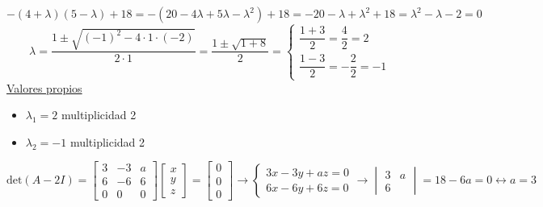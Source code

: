 \begin{enumerate}[label=\color{red}\textbf{\arabic*)}]
    $-(4+\lambda)(5-\lambda)+18=-(20-4\lambda+5\lambda -\lambda^2)+18=-20-\lambda+\lambda^2+18=\lambda^2-\lambda-2=0$ \[
    \lambda=\dfrac{1\pm\sqrt{(-1)^2-4\cdot 1\cdot (-2)} }{2\cdot 1}=\dfrac{1\pm\sqrt{1+8} }{2}=\begin{cases}
        \dfrac{1+3}{2}=\dfrac{4}{2}=2\\
        \dfrac{1-3}{2}=-\dfrac{2}{2}=-1
    \end{cases} 
    \] 
    \underline{Valores propios}
\begin{itemize}[label=\textbullet]
    \item $\lambda_1=2$ multiplicidad 2
    \item $\lambda_2=-1$ multiplicidad 2
\end{itemize}
$\mathrm{det}(A-2I)=\begin{bmatrix} 
    3 & -3 & a\\
    6 & -6 & 6\\
    0 & 0 & 0
\end{bmatrix}\begin{bmatrix} 
x\\y\\z 
\end{bmatrix}=\begin{bmatrix} 
0\\0\\0 
\end{bmatrix}\longrightarrow \begin{cases}
    3x-3y+az=0\\
    6x-6y+6z=0
\end{cases}\longrightarrow \begin{vmatrix} 
    3 & a\\
    6  & 
\end{vmatrix}=18-6a=0\longleftrightarrow a=3$


\end{enumerate}
